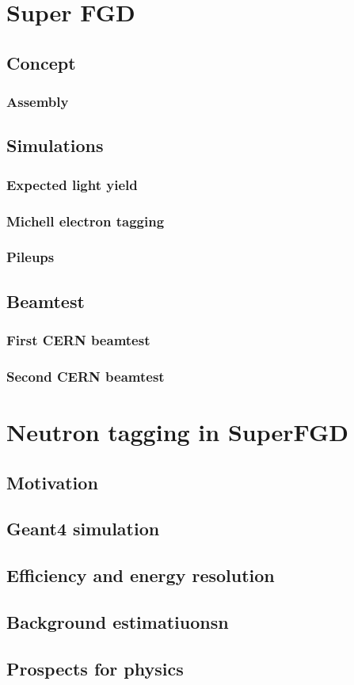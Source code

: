 \documentclass[../main.tex]{subfiles}
\begin{document}
\chapter{Super FGD}
\section{Concept}
\subsection{Assembly}
\section{Simulations}
\subsection{Expected light yield}
\subsection{Michell electron tagging}
\subsection{Pileups}
\section{Beamtest}
\subsection{First CERN beamtest}
\subsection{Second CERN beamtest}

\chapter{Neutron tagging in SuperFGD}
\section{Motivation}
\section{Geant4 simulation}
\section{Efficiency and energy resolution}
\section{Background estimatiuonsn}
\section{Prospects for physics}
\end{document}
